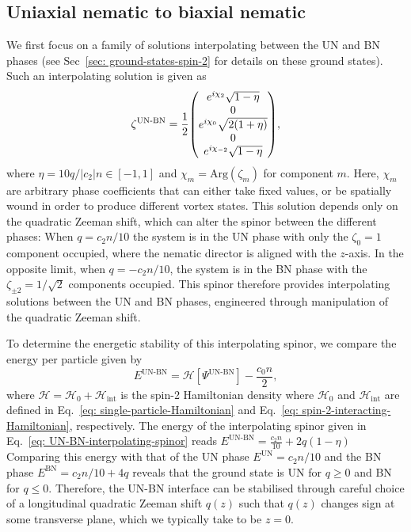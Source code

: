\subsection{Uniaxial nematic to biaxial nematic}\label{subsec: UN-BN-defects}
We first focus on a family of solutions interpolating between the UN and BN
phases (see Sec~\ref{sec: ground-states-spin-2} for details on these ground
states).
Such an interpolating solution is given as
\begin{equation}\label{eq: UN-BN-interpolating-spinor}
    \zeta^\text{UN-BN} = \frac{1}{2}\mqty(
    e^{i\chi_2}\sqrt{1 - \eta} \\
    0 \\
    e^{i\chi_0}\sqrt{2(1+\eta)} \\
    0 \\
    e^{i\chi_{-2}}\sqrt{1 - \eta}
    ),
\end{equation}
where \(\eta = 10q /|c_2|n \in [-1, 1]\) and \(\chi_m = \text{Arg}(\zeta_m)\)
for component \(m\).
Here, \(\chi_m\) are arbitrary phase coefficients that can either take fixed
values, or be spatially wound in order to produce different vortex states.
This solution depends only on the quadratic Zeeman shift, which can alter the
spinor between the different phases: When \(q = c_2n / 10\) the system is in the
UN phase with only the \(\zeta_0=1\) component occupied, where the nematic
director is aligned with the \(z\)-axis.
In the opposite limit, when \(q = -c_2n/10\), the system is in the
BN phase with the \(\zeta_{\pm 2} = 1/\sqrt{2}\) components occupied.
This spinor therefore provides interpolating solutions between the UN and BN
phases, engineered through manipulation of the quadratic Zeeman shift.

To determine the energetic stability of this interpolating spinor, we compare
the energy per particle given by~\cite{Kawaguchi2012}
\begin{equation}
    E^\text{UN-BN} = \mathcal{H}[\Psi^\text{UN-BN}] - \frac{c_0n}{2},
\end{equation}
where \(\mathcal{H} = \mathcal{H}_0 + \mathcal{H}_\text{int}\) is the spin-2
Hamiltonian density where \(\mathcal{H}_0\) and \(\mathcal{H}_\text{int}\)
are defined in Eq.~\eqref{eq: single-particle-Hamiltonian} and
Eq.~\eqref{eq: spin-2-interacting-Hamiltonian}, respectively.
The energy of the interpolating spinor given in
Eq.~\eqref{eq: UN-BN-interpolating-spinor} reads
\(E^\text{UN-BN} = \frac{c_2n}{10} + 2q(1 - \eta)\)
Comparing this energy with that of the UN phase
\(E^\text{UN} = c_2n/10\) and the BN phase
\(E^\text{BN} = c_2n/10 + 4q\) reveals that the ground state is UN for
\(q \geq 0\) and BN for \(q \leq 0\).
Therefore, the UN-BN interface can be stabilised through careful choice of
a longitudinal quadratic Zeeman shift \(q(z)\) such that \(q(z)\) changes
sign at some transverse plane, which we typically take to be \(z=0\).

